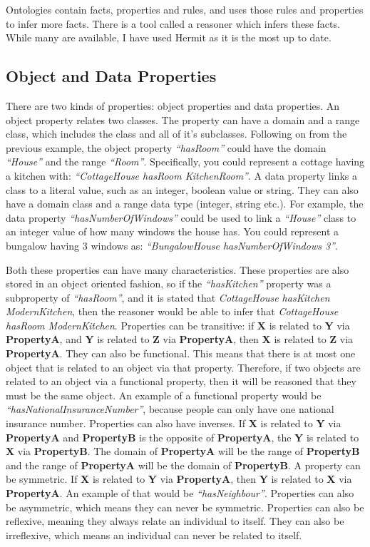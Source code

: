 Ontologies contain facts, properties and rules, and uses those rules and properties to infer more facts. There is a tool called a reasoner which infers these facts. While many are available, I have used Hermit \cite{hermit} as it is the most up to date.

\subsection{Object and Data Properties}

There are two kinds of properties: object properties and data properties. An object property relates two classes. The property can have a domain and a range class, which includes the class and all of it's subclasses. Following on from the previous example, the object property \textit{``hasRoom''} could have the domain \textit{``House''} and the range \textit{``Room''}. Specifically, you could represent a cottage having a kitchen with: \textit{``CottageHouse hasRoom KitchenRoom''}. A data property links a class to a literal value, such as an integer, boolean value or string. They can also have a domain class and a range data type (integer, string etc.). For example, the data property \textit{``hasNumberOfWindows''} could be used to link a \textit{``House''} class to an integer value of how many windows the house has. You could represent a bungalow having 3 windows as: \textit{``BungalowHouse hasNumberOfWindows 3''}. 

Both these properties can have many characteristics. These properties are also stored in an object oriented fashion, so if the \textit{``hasKitchen''} property was a subproperty of \textit{``hasRoom''}, and it is stated that \textit{CottageHouse hasKitchen ModernKitchen}, then the reasoner would be able to infer that \textit{CottageHouse hasRoom ModernKitchen}. Properties can be transitive: if \textbf{X} is related to \textbf{Y} via \textbf{PropertyA}, and \textbf{Y} is related to \textbf{Z} via \textbf{PropertyA}, then \textbf{X} is related to \textbf{Z} via \textbf{PropertyA}. They can also be functional. This means that there is at most one object that is related to an object via that property. Therefore, if two objects are related to an object via a functional property, then it will be reasoned that they must be the same object. An example of a functional property would be \textit{``hasNationalInsuranceNumber''}, because people can only have one national insurance number. Properties can also have inverses. If \textbf{X} is related to \textbf{Y} via \textbf{PropertyA} and \textbf{PropertyB} is the opposite of \textbf{PropertyA}, the \textbf{Y} is related to \textbf{X} via \textbf{PropertyB}. The domain of \textbf{PropertyA} will be the range of \textbf{PropertyB} and the range of \textbf{PropertyA} will be the domain of \textbf{PropertyB}. A property can be symmetric. If \textbf{X} is related to \textbf{Y} via \textbf{PropertyA}, then \textbf{Y} is related to \textbf{X} via \textbf{PropertyA}. An example of that would be \textit{``hasNeighbour''}. Properties can also be asymmetric, which means they can never be symmetric. Properties can also be reflexive, meaning they always relate an individual to itself. They can also be irreflexive, which means an individual can never be related to itself.

